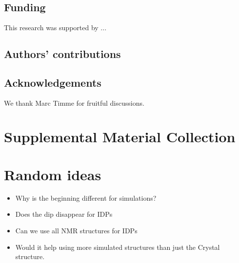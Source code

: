 \documentclass[
reprint,
twocolumn,
amsmath,amssymb,superscriptaddress,aps,
pre]{revtex4-1}
\begin{document}
\subsection{Funding}
This research was supported by ...
\subsection{Authors' contributions}

\subsection{Acknowledgements}
We thank Marc Timme for fruitful discussions.




\appendix
\section{Supplemental Material Collection}
\section{Random ideas}
\begin{itemize}
    \item Why is the beginning different for simulations?
    \item Does the dip disappear for IDPs
    \item Can we use all NMR structures for IDPs
    \item Would it help using more simulated structures than just the Crystal structure. 
\end{itemize}
\end{document}
